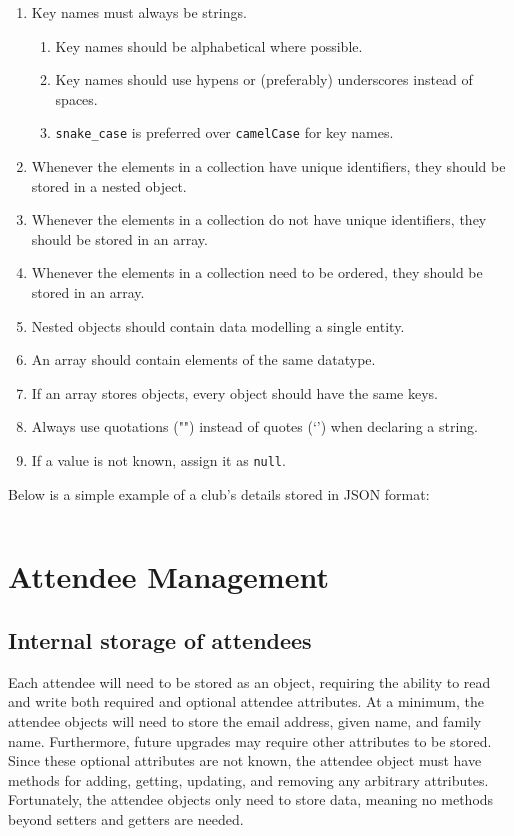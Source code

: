 \documentclass[11pt]{article}
\begin{document}
\begin{enumerate}
    \item Key names must always be strings.
    \begin{enumerate}
        \item Key names should be alphabetical where possible.
        \item Key names should use hypens or (preferably) underscores instead of spaces.
        \item \texttt{snake\_case} is preferred over \texttt{camelCase} for key names.
    \end{enumerate}
    \item Whenever the elements in a collection have unique identifiers, they should be stored in a nested object.
    \item Whenever the elements in a collection do not have unique identifiers, they should be stored in an array.
    \item Whenever the elements in a collection need to be ordered, they should be stored in an array.
    \item Nested objects should contain data modelling a single entity.
    \item An array should contain elements of the same datatype.
    \item If an array stores objects, every object should have the same keys.
    \item Always use quotations ("") instead of quotes (`') when declaring a string.
    \item If a value is not known, assign it as \texttt{null}.
\end{enumerate}

Below is a simple example of a club's details stored in JSON format:

\inputminted[linenos=true]{json}{json_examples/club_details.json}

\newpage

\section{Attendee Management}

\subsection{Internal storage of attendees}

Each attendee will need to be stored as an object, requiring the ability to read and write both required and optional attendee attributes. At a minimum, the attendee objects will need to store the email address, given name, and family name. Furthermore, future upgrades may require other attributes to be stored. Since these optional attributes are not known, the attendee object must have methods for adding, getting, updating, and removing any arbitrary attributes. Fortunately, the attendee objects only need to store data, meaning no methods beyond setters and getters are needed.
\end{document}
